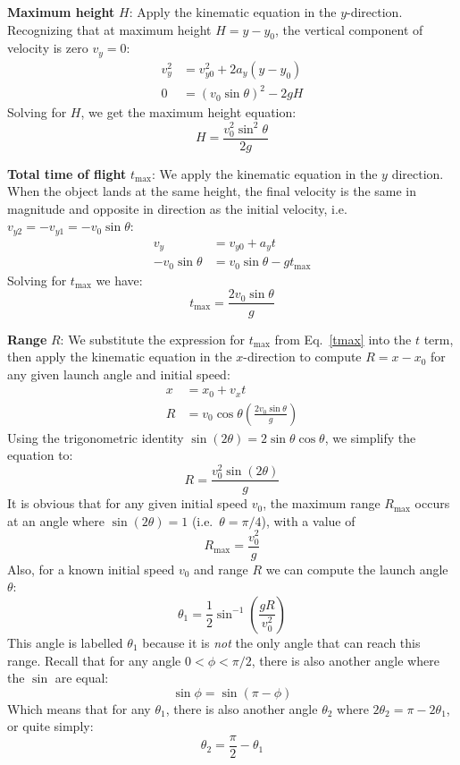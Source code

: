 \documentclass[11pt]{article}
\begin{document}
\textbf{Maximum height} $H$: Apply the kinematic equation in the $y$-direction.
Recognizing that at maximum height $H=y-y_0$, the vertical component of
velocity is zero $v_y=0$:
\begin{align*}
  v_y^2 &= v_{y0}^2 + 2a_y(y-y_0)\\
  0  &= (v_0\sin\theta)^2-2gH
\end{align*}
Solving for $H$, we get the maximum height equation:
\begin{equation}
  \boxed{H=\frac{v_0^2\sin^2\theta}{2g}}
\end{equation}
\newpage

\textbf{Total time of flight} $t_\mathrm{max}$: We apply the kinematic equation
in the $y$ direction. When the object lands at the same height, the final
velocity is the same in magnitude and opposite in direction as the initial
velocity, i.e.\  $v_{y2}=-v_{y1}=-v_0\sin\theta$:
\begin{align*}
  v_y &=v_{y0}+a_yt\\
  -v_0\sin\theta &=v_0\sin\theta -g t_\mathrm{max}
\end{align*}
Solving for $t_{\text{max}}$ we have:
\begin{equation}
  \boxed{t_{\text{max}}=\frac{2v_0\sin\theta}{g}}
  \label{tmax}
\end{equation}

\textbf{Range} $R$: We substitute the expression for $t_{\text{max}}$ from
Eq.~\ref{tmax} into the $t$ term, then apply the kinematic equation in
the $x$-direction to compute $R=x-x_0$ for any given launch angle and initial
speed:
\begin{align*}
  x&=x_0+v_xt\\
  R &=v_0\cos\theta\left(\frac{2v_0\sin\theta}{g}\right)
\end{align*}
Using the trigonometric identity $\sin(2\theta)=2\sin\theta\cos\theta$, we
simplify the equation to:
\begin{equation}
  \boxed{R=\frac{v_0^2\sin(2\theta)}{g}}
\end{equation}
It is obvious that for any given initial speed $v_0$, the maximum range
$R_{\text{max}}$ occurs at an angle where $\sin(2\theta)=1$
(i.e.\ $\theta=\pi/4$), with a value of
\begin{equation}
  \boxed{R_\mathrm{max}=\frac{v_0^2}{g}}
\end{equation}
Also, for a known initial speed $v_0$ and range $R$ we can compute the launch
angle $\theta$:
\begin{displaymath}
  \theta_1=\frac{1}{2}\sin^{-1}\left(\frac{gR}{v_0^2}\right)
\end{displaymath}
This angle is labelled $\theta_1$ because it is \emph{not} the only angle that
can reach this range. Recall that for any angle $0<\phi<\pi/2$, there
is also another angle where the $\sin$ are equal:
\begin{displaymath}
  \sin\phi=\sin(\pi-\phi)
\end{displaymath}
Which means that for any $\theta_1$, there is also another angle
$\theta_2$ where $2\theta_2=\pi-2\theta_1$, or quite simply:
\begin{displaymath}
  \theta_2=\frac{\pi}{2}-\theta_1
\end{displaymath}
\end{document}
